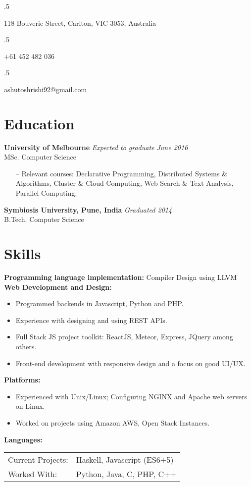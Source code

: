 \documentclass[overlapped]{res}
\begin{document}


\begin{resume}
  \moveleft.5\hoffset\centerline{118 Bouverie Street, Carlton, VIC 3053, Australia}
  \moveleft.5\hoffset\centerline{+61 452 482 036}
  \moveleft.5\hoffset\centerline{ashutoshrishi92@gmail.com}
  
  \section{Education}  
  \textbf{University of Melbourne} \hfill \textit{Expected to graduate June 2016} \\
  MSc. Computer Science 
  \begin{itemize} \itemsep -2pt
  \item[--] Relevant courses: Declarative Programming, Distributed Systems \&\\ 
    Algorithms, Cluster \& Cloud Computing, Web Search \& Text Analysis, \\ 
    Parallel Computing.
  \end{itemize}

  \textbf{Symbiosis University, Pune, India} \hfill \textit{Graduated 2014} \\
  B.Tech. Computer Science 

  \section{Skills} 
  \textbf{Programming language implementation:} Compiler Design using LLVM \\
  \textbf{Web Development and Design:}
  \begin{itemize}
  \item Programmed backends in Javascript, Python and PHP.
  \item Experience with designing and using REST APIs.
  \item Full Stack JS project toolkit: ReactJS, Meteor, Express, JQuery among 
    others.
  \item Front-end development with responsive design and a focus on good UI/UX.
  \end{itemize}
  \textbf{Platforms:}
  \begin{itemize}
  \item Experienced with Unix/Linux; Configuring NGINX and Apache web servers on
    Linux.
  \item Worked on projects using Amazon AWS, Open Stack Instances. 
  \end{itemize}
  \textbf{Languages:} \\ 
  \begin{tabular}{l l}
    Current Projects: & Haskell, Javascript (ES6+5) \\ 
    Worked With: & Python, Java, C, PHP, C++
  \end{tabular}


\end{resume}
\end{document}
